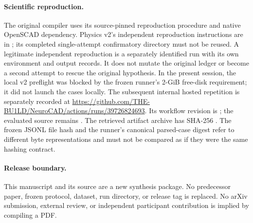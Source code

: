 \documentclass[10pt]{article}
\begin{document}
\paragraph{Scientific reproduction.}
The original compiler uses its source-pinned reproduction procedure and
native OpenSCAD dependency. Physics v2's independent reproduction instructions
are in ; its completed
single-attempt confirmatory directory must not be reused. A legitimate
independent reproduction is a separately identified run with its own
environment and output records. It does not mutate the original ledger or
become a second attempt to rescue the original hypothesis. In the present
session, the local v2 preflight was blocked by the frozen runner's 2-GiB
free-disk requirement; it did not launch the cases locally. The subsequent
internal hosted repetition is separately recorded at
\url{https://github.com/THE-BU1LD/NeuroCAD/actions/runs/39726824693}.
Its workflow revision is
; the evaluated source remains
.
The retrieved artifact archive has SHA-256
.
The frozen JSONL file hash and the runner's canonical parsed-case digest
refer to different byte representations and must not be compared as if
they were the same hashing contract.

\paragraph{Release boundary.}
This manuscript and its source are a new synthesis package. No predecessor
paper, frozen protocol, dataset, run directory, or release tag is replaced.
No arXiv submission, external review, or independent participant contribution
is implied by compiling a PDF.
\end{document}
